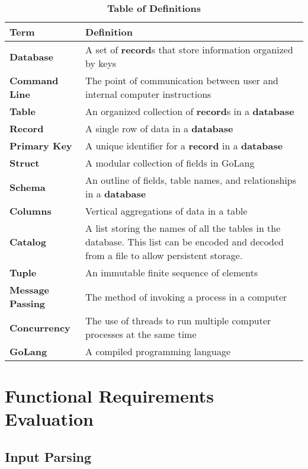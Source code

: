 \documentclass[12pt, titlepage]{article}
\begin{document}
\begin{table}[H]
\caption{\textbf{Table of Definitions}} \label{Table}

\begin{tabularx}{\textwidth}{p{3cm}X}
\toprule
\textbf{Term} & \textbf{Definition}\\
\midrule
\textbf{Database} & A set of \textbf{record}s that store information organized by keys\\
\textbf{Command Line} & The point of communication between user and internal computer instructions\\
\textbf{Table} & An organized collection of \textbf{record}s in a \textbf{database}\\
\textbf{Record} & A single row of data in a \textbf{database}\\
\textbf{Primary Key} & A unique identifier for a \textbf{record} in a \textbf{database}\\
\textbf{Struct} & A modular collection of fields in GoLang \\
\textbf{Schema} & An outline of fields, table names, and relationships in a \textbf{database} \\
\textbf{Columns} & Vertical aggregations of data in a table \\
\textbf{Catalog} & A list storing the names of all the tables in the database. This list can be encoded and decoded from a file to allow persistent storage.\\
\textbf{Tuple} & An immutable finite sequence of elements\\
\textbf{Message Passing} & The method of invoking a process in a computer\\
\textbf{Concurrency} & The use of threads to run multiple computer processes at the same time\\
\textbf{GoLang} & A compiled programming language\\

\bottomrule
\end{tabularx}

\end{table}	

\newpage

\section{Functional Requirements Evaluation}
	
\subsection{Input Parsing}
\end{document}
